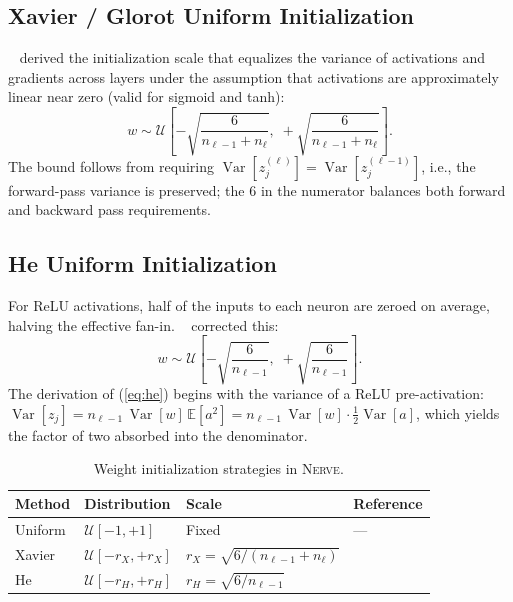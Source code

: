 \documentclass[11pt,a4paper]{article}
\newcommand{\nerve}{\textsc{Nerve}}
\begin{document}
\subsection{Xavier / Glorot Uniform Initialization}

\citeauthor{glorot2010}~\cite{glorot2010} derived the initialization
scale that equalizes the variance of activations and gradients across layers
under the assumption that activations are approximately linear near zero
(valid for sigmoid and tanh):
\begin{equation}
  w \sim \mathcal{U}\!\left[
    -\sqrt{\frac{6}{n_{\ell-1}+n_\ell}},\;
    +\sqrt{\frac{6}{n_{\ell-1}+n_\ell}}
  \right].
  \label{eq:xavier}
\end{equation}
The bound follows from requiring
$\operatorname{Var}[z_j^{(\ell)}] = \operatorname{Var}[z_j^{(\ell-1)}]$,
i.e., the forward-pass variance is preserved; the $6$ in the numerator
balances both forward and backward pass requirements.

\subsection{He Uniform Initialization}

For ReLU activations, half of the inputs to each neuron are zeroed on
average, halving the effective fan-in. \citeauthor{he2015}~\cite{he2015}
corrected this:
\begin{equation}
  w \sim \mathcal{U}\!\left[
    -\sqrt{\frac{6}{n_{\ell-1}}},\;
    +\sqrt{\frac{6}{n_{\ell-1}}}
  \right].
  \label{eq:he}
\end{equation}
The derivation of (\ref{eq:he}) begins with the variance of a ReLU
pre-activation: $\operatorname{Var}[z_j] = n_{\ell-1}\,\operatorname{Var}[w]\,
\mathbb{E}[a^2] = n_{\ell-1}\,\operatorname{Var}[w]\cdot\tfrac{1}{2}\operatorname{Var}[a]$,
which yields the factor of two absorbed into the denominator.

\begin{table}[H]
\centering
\caption{Weight initialization strategies in \nerve{}.}
\label{tab:init}
\renewcommand{\arraystretch}{1.25}
\begin{tabular}{@{}llll@{}}
\toprule
Method & Distribution & Scale & Reference \\
\midrule
Uniform & $\mathcal{U}[-1,+1]$ & Fixed & --- \\
Xavier  & $\mathcal{U}[-r_X, +r_X]$
        & $r_X = \sqrt{6/(n_{\ell-1}+n_\ell)}$
        & \citet{glorot2010} \\
He      & $\mathcal{U}[-r_H, +r_H]$
        & $r_H = \sqrt{6/n_{\ell-1}}$
        & \citet{he2015} \\
\bottomrule
\end{tabular}
\end{table}
\end{document}
